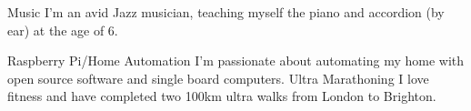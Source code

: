 



\begin{cvskills}
  \cvskill
    {Music} %
    {I'm an avid Jazz musician, teaching myself the piano and accordion (by ear) at the age of 6.} %

  \cvskill
    {Raspberry Pi/Home Automation} %
    {I'm passionate about automating my home with open source software and single board computers.} %
  \cvskill
    {Ultra Marathoning} %
    {I love fitness and have completed two 100km ultra walks from London to Brighton.} %

\end{cvskills}